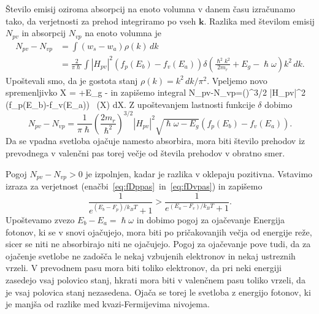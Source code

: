 Število emisij oziroma absorpcij na enoto volumna v danem času izračunamo tako,
da verjetnosti za prehod integriramo po vseh $\mathbf{k}$. Razlika med številom 
emisij $N_{pv}$ in absorpcij $N_{vp}$ na enoto volumna je
\begin{align}  
N_{pv}-N_{vp}&=\int\left(w_s-w_a\right)\rho(k)\,dk  \nonumber \\
&=\frac{2}{\pi\hslash} \int |H_{pv}|^2\left(f_p(E_b)-f_v(E_a)\right)
\delta \left(\frac{\hslash^2 k^2}{2m_r}+E_g -\hslash\omega\right) k^2\,dk.
\label{6.7}
\end{align}
Upoštevali smo, da je gostota stanj $\rho(k)=k^2\, dk/\pi^2$. Vpeljemo
novo spremenljivko 
\beq
X = +E_g -\hslash\omega
\eeq
in zapišemo integral
\beq
N_{pv}-N_{vp}=\left(\right)^{3/2}\!
\int |H_{pv}|^2 \left(f_p(E_b)-f_v(E_a)\right)
\,
\delta (X) dX.
\label{6.7a}
\eeq
Z upoštevanjem lastnosti funkcije $\delta$ dobimo
\begin{equation}  
N_{pv}-N_{vp}=\frac{1}{\pi\hslash}\left(\frac{2m_r}{\hslash^2}\right)^{3/2}
|H_{pv}|^2 \sqrt{\hslash \omega-E_g}\left(f_p(E_b)-f_v(E_a)\right)\!.
\label{6.11}
\end{equation}
Da se vpadna svetloba ojačuje namesto absorbira, mora biti število prehodov
iz prevodnega v valenčni pas torej večje od števila prehodov v obratno smer. 

Pogoj
$N_{pv}-N_{vp} >0$ je izpolnjen, kadar je razlika v oklepaju pozitivna. Vstavimo izraza
za verjetnost (enačbi~\ref{eq:fDppas}~in~\ref{eq:fDvpas}) in zapišemo
\begin{equation}  
\frac{1}{e^{(E_b-F_{p})/k_B T}+1}>\frac{1}{e^{(E_a-F_v)/k_B T}+1}.
\label{6.12}
\end{equation}
Upoštevamo zvezo $E_b-E_a = \hslash \omega$ in dobimo pogoj za ojačevanje
Energija fotonov, ki se v snovi ojačujejo, mora biti po pričakovanjih večja od
energije reže, sicer se niti ne absorbirajo niti ne ojačujejo. Pogoj za ojačevanje pove tudi, 
da za ojačenje svetlobe ne zadošča le nekaj vzbujenih elektronov in nekaj ustreznih vrzeli. 
V prevodnem pasu mora biti toliko elektronov, da pri neki energiji zasedejo vsaj polovico stanj, 
hkrati  mora biti v valenčnem pasu toliko vrzeli, da je vsaj polovica stanj nezasedena.
Ojača se torej le svetloba z energijo fotonov, ki je manjša od razlike med kvazi-Fermijevima
nivojema. 

